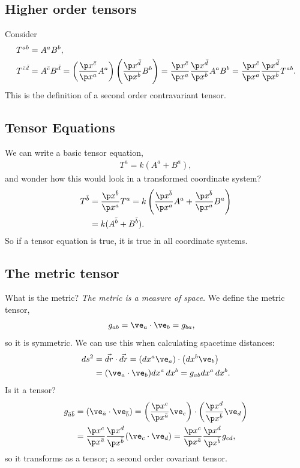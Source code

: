 \documentclass[a4paper, 11pt, normalem]{report}
\begin{document}
\chapter{}

\section{Higher order tensors}
Consider
\begin{align}
    T^{ab} &= A^aB^b, \\
    T^{\bar{c}\bar{d}} &= A^{\bar{c}}B^{\bar{d}} = \left(\frac{\p x^{\bar{c}}}{\p x^a}A^a\right)\left(\frac{\p x^{\bar{d}}}{\p x^b}B^b\right) = \frac{\p x^{\bar{c}}}{\p x^a}\frac{\p x^{\bar{d}}}{\p x^b}A^a B^b = \frac{\p x^{\bar{c}}}{\p x^a}\frac{\p x^{\bar{d}}}{\p x^b}T^{ab}.
\end{align}
This is the definition of a second order contravariant tensor.

\section{Tensor Equations}
We can write a basic tensor equation,
\begin{align}
    T^a = k(A^a+B^a),
\end{align}
and wonder how this would look in a transformed coordinate system?
\begin{align}
    T^{\bar{b}} &= \frac{\p x^{\bar{b}}}{\p x^a}T^a = k\left(\frac{\p x^{\bar{b}}}{\p x^a}A^a + \frac{\p x^{\bar{b}}}{\p x^a}B^a\right) \\
                &= k(A^{\bar{b}}+B^{\bar{b}}).
\end{align}
So if a tensor equation is true, it is true in all coordinate systems.

\section{The metric tensor}
What is the metric? \emph{The metric is a measure of space.}
We define the metric tensor,
\begin{align}
    g_{ab} &= \ve_a\cdot\ve_b = g_{ba},
\end{align}
so it is symmetric.
We can use this when calculating spacetime distances:
\begin{align}
    ds^2 &= \vec{dr}\cdot\vec{dr} = \left(dx^a\ve_a\right)\cdot\left(dx^b\ve_b\right) \\
         &= (\ve_a\cdot\ve_b)dx^a\,dx^b = g_{ab}dx^a\,dx^b.
\end{align}
Is it a tensor?
\begin{align}
    g_{\bar{a}\bar{b}} &= (\ve_{\bar{a}}\cdot\ve_{\bar{b}}) = \left(\frac{\p x^c}{\p x^{\bar{a}}}\ve_c\right)\cdot\left(\frac{\p x^{d}}{\p x^{\bar{b}}}\ve_d\right) \\
                       &= \frac{\p x^c}{\p x^{\bar{a}}}\frac{\p x^d}{\p x^{\bar{b}}}(\ve_c\cdot\ve_d) = \frac{\p x^c}{\p x^{\bar{a}}}\frac{\p x^d}{\p x^{\bar{b}}}g_{cd},
\end{align}
so it transforms as a tensor; a second order covariant tensor.
\end{document}
